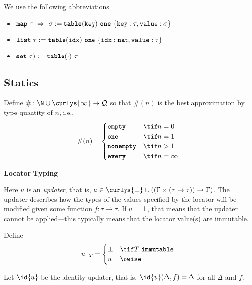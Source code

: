 \documentclass[10pt]{article}
\begin{document}
We use the following abbreviations
\begin{itemize}
    \item $\map~\tau~\Rightarrow~\sigma := \tableT(\texttt{key})~\exactlyone~\{ \texttt{key} : \tau, \texttt{value} : \sigma \}$
    \item $\listq~\tau := \tableT(\texttt{idx})~\exactlyone~\{ \texttt{idx} : \natt, \texttt{value} : \tau \}$
    \item $\setq~\tau) := \tableT(\cdot)~\tau$
\end{itemize}


\subsection{Statics}

Define $\# : \N \cup \curlys{\infty} \to \mathcal{Q}$ so that $\#(n)$ is the best approximation by type quantity of $n$, i.e.,
\[
    \#(n) =
    \begin{cases}
        \emptyq & \tif n = 0 \\
        \exactlyone & \tif n = 1 \\
        \nonempty & \tif n > 1 \\
        \every & \tif n = \infty \\
    \end{cases}
\]

 \textbf{Locator Typing}

Here $u$ is an \emph{updater}, that is, $u \in \curlys{\bot} \cup ((\Gamma \times (\tau \to \tau)) \to \Gamma)$.
The updater describes how the types of the values specified by the locator will be modified given some function $f : \tau \to \tau$.
If $u = \bot$, that means that the updater cannot be applied---this typically  means that the locator value(s) are immutable.

Define
\[
    u ||_T =
    \begin{cases}
        \bot & \tif T~\immutable \\
        u & \owise
    \end{cases}
\]

Let $\id{u}$ be the identity updater, that is, $\id{u}(\Delta, f) = \Delta$ for all $\Delta$ and $f$.

\begin{mathpar}

\end{mathpar}
\end{document}
